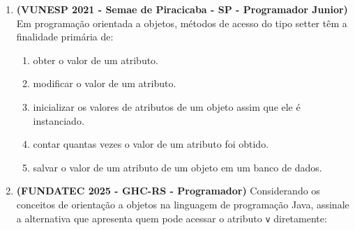 \documentclass[12pt,a4paper]{article}
\begin{document}
\begin{enumerate}
    Considerando o código da classe \texttt{AltoForno} e os princípios de Programação Orientada a Objetos, julgue os itens a seguir como Verdadeiras (V) ou Falsas (F) e assinale a sequência \textbf{correta}:

    ( ) O método \texttt{verificarFaixaTermica} (linhas 28-31) é \texttt{private}, o que significa que ele só pode ser invocado por outros métodos dentro de outras classes. \\
    ( ) Na linha 15, o método \texttt{controleSeguranca} é chamado para garantir que a temperatura não ultrapasse o limite após a injeção de combustível, demonstrando o controle de estado interno. \\
    ( ) A lógica de produção de metal na linha 20 depende exclusivamente do forno estar \texttt{ativo}, ignorando a temperatura atual do equipamento. \\
    ( ) O atributo \texttt{temperaturaInterna} (linha 03) poderia ser \texttt{public} sem afetar a segurança do equipamento, pois o método \texttt{controleSeguranca} corrigiria qualquer valor inválido.

    \begin{enumerate}[label=\Alph*)]
        \item V - V - F - F.
        \item V - F - V - V.
        \item F - V - V - F.
        \item V - V - V - F.
        \item F - F - F - V.
    \end{enumerate}


    \item \textbf{(VUNESP 2021 - Semae de Piracicaba - SP - Programador Junior)} Em programação orientada a objetos, métodos de acesso do tipo setter têm a finalidade primária de:
    \begin{enumerate}[label=\Alph*)]
        \item obter o valor de um atributo.
        \item modificar o valor de um atributo.
        \item inicializar os valores de atributos de um objeto assim que ele é instanciado.
        \item contar quantas vezes o valor de um atributo foi obtido.
        \item salvar o valor de um atributo de um objeto em um banco de dados.
    \end{enumerate}

    \item \textbf{(FUNDATEC 2025 - GHC-RS - Programador)} Considerando os conceitos de orientação a objetos na linguagem de programação Java, assinale a alternativa que apresenta quem pode acessar o atributo \texttt{v} diretamente:


\end{enumerate}
\end{document}

